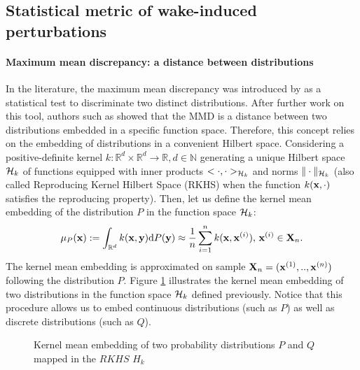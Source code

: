 \subsection{Statistical metric of wake-induced perturbations}\label{sec:metric}

\paragraph{Maximum mean discrepancy: a distance between distributions}
In the literature, the maximum mean discrepancy was introduced by \cite{gretton_2006} as a statistical test to discriminate two distinct distributions. 
After further work on this tool, authors such as \cite{sriperumbudur_2010} showed that the MMD is a distance between two distributions embedded in a specific function space. 
Therefore, this concept relies on the embedding of distributions in a convenient Hilbert space.
Considering a positive-definite kernel $k:\mathbb{R}^d \times \mathbb{R}^d \xrightarrow{} \mathbb{R},d \in \mathbb{N}$ 
generating a unique Hilbert space $\mathcal{H}_k$ of functions equipped with inner products $ <\cdot,\cdot >_{\mathcal{H}_k}$ and norms $\| \cdot \| _{\mathcal{H}_k}$ (also called Reproducing Kernel Hilbert 
Space (RKHS) when the function $k({\bf x},\cdot )$ satisfies the reproducing property). 
Then, let us define the kernel mean embedding of the distribution $P$ in the function space $\mathcal{H}_k$:
\begin{equation}
\mu_P ({\bf x}):=\int_{\mathbb{R}^d}{k({\bf x}, {\bf y}) \mathrm{d}P({\bf y}) } \approx \frac{1}{n} \sum_{i=1}^{n}{k({\bf x},{\bf x}^{(i)})},\, {\bf x}^{(i)} \in {\bf X}_n.
\end{equation}
The kernel mean embedding is approximated on sample ${\bf X}_n=({\bf x}^{(1)},..,{\bf x}^{(n)})$ following the distribution $P$.
Figure \ref{fig:kernel_embedding} illustrates the kernel mean embedding of two distributions in the function space $\mathcal{H}_k$ defined previously. 
Notice that this procedure allows us to embed continuous distributions (such as $P$) as well as discrete distributions (such as $Q$).

\begin{figure}[h]
    \centering
    
    \caption{Kernel mean embedding of two probability distributions $P$ and $Q$ mapped in the $RKHS$  $H_k$}
    \label{fig:kernel_embedding}
\end{figure}

